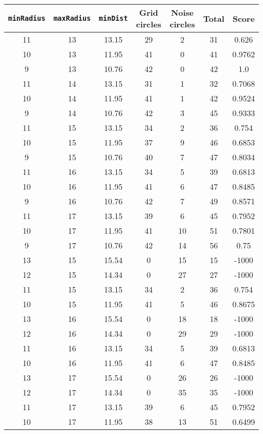 \documentclass[letterpaper, 12pt]{article}
\begin{document}
\begin{longtable}{|c|c|c|c|c|c|c|}
\hline
\textbf{\texttt{minRadius}} & \textbf{\texttt{maxRadius}} & \textbf{\texttt{minDist}} & \textbf{Grid circles} & \textbf{Noise circles} & \textbf{Total} & \textbf{Score} \\
\hline
11 & 13 & 13.15 & 29 & 2 & 31 & 0.626 \\
\hline
10 & 13 & 11.95 & 41 & 0 & 41 & 0.9762 \\
\hline
9 & 13 & 10.76 & 42 & 0 & 42 & 1.0 \\
\hline
11 & 14 & 13.15 & 31 & 1 & 32 & 0.7068 \\
\hline
10 & 14 & 11.95 & 41 & 1 & 42 & 0.9524 \\
\hline
9 & 14 & 10.76 & 42 & 3 & 45 & 0.9333 \\
\hline
11 & 15 & 13.15 & 34 & 2 & 36 & 0.754 \\
\hline
10 & 15 & 11.95 & 37 & 9 & 46 & 0.6853 \\
\hline
9 & 15 & 10.76 & 40 & 7 & 47 & 0.8034 \\
\hline
11 & 16 & 13.15 & 34 & 5 & 39 & 0.6813 \\
\hline
10 & 16 & 11.95 & 41 & 6 & 47 & 0.8485 \\
\hline
9 & 16 & 10.76 & 42 & 7 & 49 & 0.8571 \\
\hline
11 & 17 & 13.15 & 39 & 6 & 45 & 0.7952 \\
\hline
10 & 17 & 11.95 & 41 & 10 & 51 & 0.7801 \\
\hline
9 & 17 & 10.76 & 42 & 14 & 56 & 0.75 \\
\hline
13 & 15 & 15.54 & 0 & 15 & 15 & -1000 \\
\hline
12 & 15 & 14.34 & 0 & 27 & 27 & -1000 \\
\hline
11 & 15 & 13.15 & 34 & 2 & 36 & 0.754 \\
\hline
10 & 15 & 11.95 & 41 & 5 & 46 & 0.8675 \\
\hline
13 & 16 & 15.54 & 0 & 18 & 18 & -1000 \\
\hline
12 & 16 & 14.34 & 0 & 29 & 29 & -1000 \\
\hline
11 & 16 & 13.15 & 34 & 5 & 39 & 0.6813 \\
\hline
10 & 16 & 11.95 & 41 & 6 & 47 & 0.8485 \\
\hline
13 & 17 & 15.54 & 0 & 26 & 26 & -1000 \\
\hline
12 & 17 & 14.34 & 0 & 35 & 35 & -1000 \\
\hline
11 & 17 & 13.15 & 39 & 6 & 45 & 0.7952 \\
\hline
10 & 17 & 11.95 & 38 & 13 & 51 & 0.6499 \\

\end{longtable}
\end{document}
